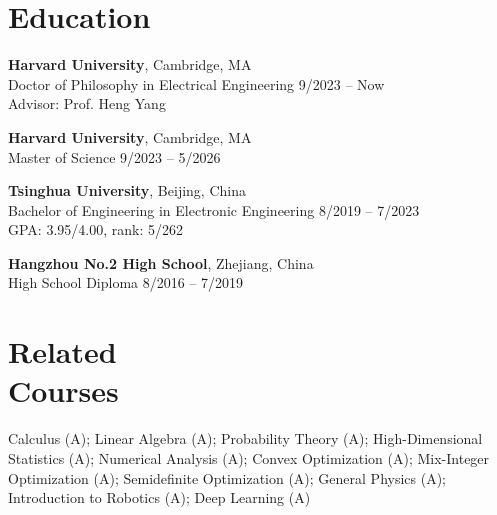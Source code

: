
    \section{\mysidestyle Education}

    \textbf{Harvard University}, Cambridge, MA \vspace{1mm}\\\vspace{1mm}%
    {Doctor of Philosophy in Electrical Engineering} \hfill 9/2023 -- Now \\
    Advisor: Prof. Heng Yang 

    \textbf{Harvard University}, Cambridge, MA \vspace{1mm}\\\vspace{1mm}%
    {Master of Science} \hfill 9/2023 -- 5/2026 

    \textbf{Tsinghua University}, Beijing, China \vspace{1mm}\\\vspace{1mm}%
    {Bachelor of Engineering in Electronic Engineering} \hfill 8/2019 -- 7/2023\\\vspace{1mm}%
    GPA: 3.95/4.00, rank: 5/262

    \textbf{Hangzhou No.2 High
    School}, Zhejiang, China \vspace{1mm}\\\vspace{1mm}%
    {High School Diploma} \hfill 8/2016 -- 7/2019 

    \section{\mysidestyle Related \\ Courses} 

    Calculus (A); Linear Algebra (A); Probability Theory (A); High-Dimensional Statistics (A); Numerical Analysis (A); Convex Optimization (A); Mix-Integer Optimization (A); Semidefinite Optimization (A); General Physics (A); Introduction to Robotics (A); Deep Learning (A)


